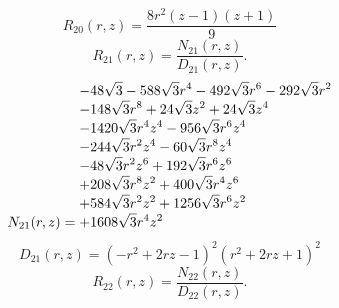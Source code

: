 \documentclass[11pt,a4paper]{article}
\begin{document}
\begin{equation}
R_{20}(r,z)=\frac{8 r^{2} \left(z - 1\right) \left(z + 1\right)}{9}
\label{eq:cat-rational-20}
\end{equation}
\begin{equation}
R_{21}(r,z)=\frac{N_{21}(r,z)}{D_{21}(r,z)}.
\label{eq:cat-rational-21}
\end{equation}
\begin{equation}
N_{21}(r,z)=\shortstack[l]{$\displaystyle  - 48 \sqrt{3} - 588 \sqrt{3} r^{4} - 492 \sqrt{3} r^{6} - 292 \sqrt{3} r^{2}$\\
$\displaystyle  - 148 \sqrt{3} r^{8} + 24 \sqrt{3} z^{2} + 24 \sqrt{3} z^{4}$\\
$\displaystyle  - 1420 \sqrt{3} r^{4} z^{4} - 956 \sqrt{3} r^{6} z^{4}$\\
$\displaystyle  - 244 \sqrt{3} r^{2} z^{4} - 60 \sqrt{3} r^{8} z^{4}$\\
$\displaystyle  - 48 \sqrt{3} r^{2} z^{6} + 192 \sqrt{3} r^{6} z^{6}$\\
$\displaystyle  + 208 \sqrt{3} r^{8} z^{2} + 400 \sqrt{3} r^{4} z^{6}$\\
$\displaystyle  + 584 \sqrt{3} r^{2} z^{2} + 1256 \sqrt{3} r^{6} z^{2}$\\
$\displaystyle  + 1608 \sqrt{3} r^{4} z^{2}$}
\label{eq:cat-numerator-21}
\end{equation}
\begin{equation}
D_{21}(r,z)=\left(- r^{2} + 2 r z - 1\right)^{2} \left(r^{2} + 2 r z + 1\right)^{2}
\label{eq:cat-denominator-21}
\end{equation}
\begin{equation}
R_{22}(r,z)=\frac{N_{22}(r,z)}{D_{22}(r,z)}.
\label{eq:cat-rational-22}
\end{equation}
\end{document}
